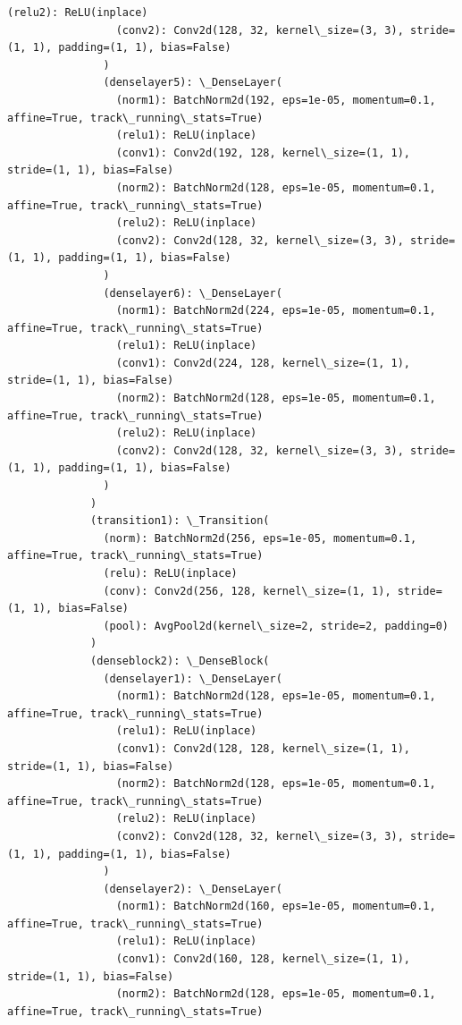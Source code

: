 \documentclass[11pt]{article}
\begin{document}
\begin{Verbatim}[commandchars=\\\{\}]
                 (relu2): ReLU(inplace)
                 (conv2): Conv2d(128, 32, kernel\_size=(3, 3), stride=(1, 1), padding=(1, 1), bias=False)
               )
               (denselayer5): \_DenseLayer(
                 (norm1): BatchNorm2d(192, eps=1e-05, momentum=0.1, affine=True, track\_running\_stats=True)
                 (relu1): ReLU(inplace)
                 (conv1): Conv2d(192, 128, kernel\_size=(1, 1), stride=(1, 1), bias=False)
                 (norm2): BatchNorm2d(128, eps=1e-05, momentum=0.1, affine=True, track\_running\_stats=True)
                 (relu2): ReLU(inplace)
                 (conv2): Conv2d(128, 32, kernel\_size=(3, 3), stride=(1, 1), padding=(1, 1), bias=False)
               )
               (denselayer6): \_DenseLayer(
                 (norm1): BatchNorm2d(224, eps=1e-05, momentum=0.1, affine=True, track\_running\_stats=True)
                 (relu1): ReLU(inplace)
                 (conv1): Conv2d(224, 128, kernel\_size=(1, 1), stride=(1, 1), bias=False)
                 (norm2): BatchNorm2d(128, eps=1e-05, momentum=0.1, affine=True, track\_running\_stats=True)
                 (relu2): ReLU(inplace)
                 (conv2): Conv2d(128, 32, kernel\_size=(3, 3), stride=(1, 1), padding=(1, 1), bias=False)
               )
             )
             (transition1): \_Transition(
               (norm): BatchNorm2d(256, eps=1e-05, momentum=0.1, affine=True, track\_running\_stats=True)
               (relu): ReLU(inplace)
               (conv): Conv2d(256, 128, kernel\_size=(1, 1), stride=(1, 1), bias=False)
               (pool): AvgPool2d(kernel\_size=2, stride=2, padding=0)
             )
             (denseblock2): \_DenseBlock(
               (denselayer1): \_DenseLayer(
                 (norm1): BatchNorm2d(128, eps=1e-05, momentum=0.1, affine=True, track\_running\_stats=True)
                 (relu1): ReLU(inplace)
                 (conv1): Conv2d(128, 128, kernel\_size=(1, 1), stride=(1, 1), bias=False)
                 (norm2): BatchNorm2d(128, eps=1e-05, momentum=0.1, affine=True, track\_running\_stats=True)
                 (relu2): ReLU(inplace)
                 (conv2): Conv2d(128, 32, kernel\_size=(3, 3), stride=(1, 1), padding=(1, 1), bias=False)
               )
               (denselayer2): \_DenseLayer(
                 (norm1): BatchNorm2d(160, eps=1e-05, momentum=0.1, affine=True, track\_running\_stats=True)
                 (relu1): ReLU(inplace)
                 (conv1): Conv2d(160, 128, kernel\_size=(1, 1), stride=(1, 1), bias=False)
                 (norm2): BatchNorm2d(128, eps=1e-05, momentum=0.1, affine=True, track\_running\_stats=True)

\end{Verbatim}
\end{document}
